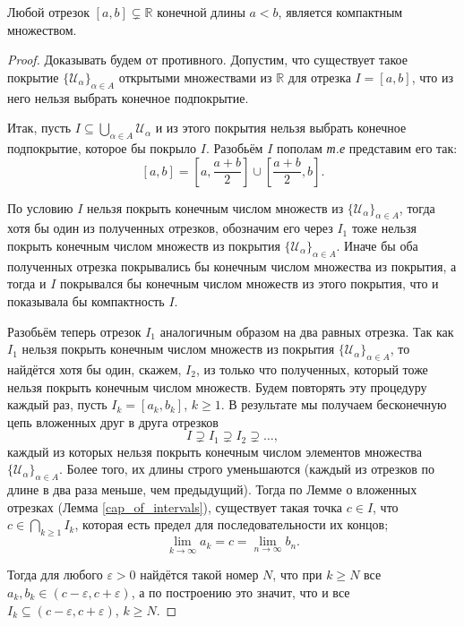 \begin{theorem}\label{[a,b]is_compact}
    Любой отрезок $[a,b] \subsetneq \mathbb{R}$ конечной длины $a<b$, является компактным множеством.
\end{theorem}

\begin{proof}
Доказывать будем от противного. Допустим, что существует такое покрытие $\{\mathscr{U}_\alpha\}_{\alpha \in A}$ открытыми множествами из $\mathbb{R}$ для отрезка $I = [a,b]$, что из него нельзя выбрать конечное подпокрытие. 

Итак, пусть $I \subseteq \bigcup_{\alpha \in A} \mathscr{U}_\alpha$ и из этого покрытия нельзя выбрать конечное подпокрытие, которое бы покрыло $I$. Разобьём $I$ пополам \textit{т.е} представим его так:
    \[
     [a, b] = \left[ a, \frac{a+b}{2} \right] \cup \left[\frac{a+b}{2}, b \right].
    \]


По условию $I$ нельзя покрыть конечным числом множеств из $\{ \mathscr{U}_\alpha\}_{\alpha \in A}$, тогда хотя бы один из полученных отрезков, обозначим его через $I_1$ тоже нельзя покрыть конечным числом множеств из покрытия $\{ \mathscr{U}_\alpha\}_{\alpha \in A}$. Иначе бы оба полученных отрезка покрывались бы конечным числом множества из покрытия, а тогда и $I$ покрывался бы конечным числом множеств из этого покрытия, что и показывала бы компактность $I$. 

Разобьём теперь отрезок $I_1$ аналогичным образом на два равных отрезка. Так как $I_1$ нельзя покрыть конечным числом множеств из покрытия $\{ \mathscr{U}_\alpha\}_{\alpha \in A}$, то найдётся хотя бы один, скажем, $I_2$, из только что полученных, который тоже нельзя покрыть конечным числом множеств. Будем повторять эту процедуру каждый раз, пусть $I_k = [a_k,b_k]$, $k\ge 1$. В результате мы получаем бесконечную цепь вложенных друг в друга отрезков 
\[
 I \supsetneq I_1 \supsetneq I_2 \supsetneq \ldots,
\]
каждый из которых нельзя покрыть конечным числом элементов множества $\{\mathscr{U}_\alpha\}_{\alpha \in A}$. Более того, их длины строго уменьшаются (каждый из отрезков по длине в два раза меньше, чем предыдущий). Тогда по Лемме о вложенных отрезках (Лемма \ref{cap_of_intervals}), существует такая точка $c \in I$, что $c \in \bigcap_{k \ge 1} I_k $,
которая есть предел для последовательности их концов;
\[
 \lim_{k\to \infty }a_k  = c = \lim_{n \to \infty}b_n.
\]

Тогда для любого $\varepsilon >0$ найдётся такой номер $N$, что при $k \ge N$ все $a_k, b_k \in (c - \varepsilon, c + \varepsilon)$, а по построению это значит, что и все $I_k \subseteq (c-\varepsilon, c+\varepsilon)$, $k \ge N.$


\end{proof}
